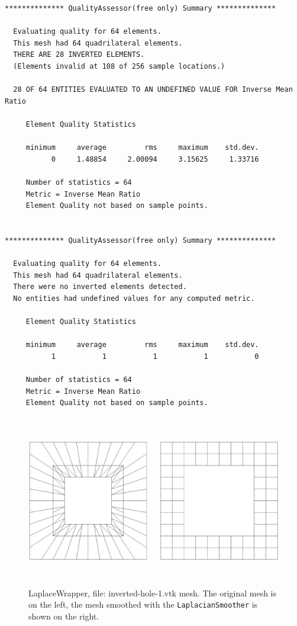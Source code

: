 \begin{verbatim}
************** QualityAssessor(free only) Summary **************

  Evaluating quality for 64 elements.
  This mesh had 64 quadrilateral elements.
  THERE ARE 28 INVERTED ELEMENTS.
  (Elements invalid at 108 of 256 sample locations.)

  28 OF 64 ENTITIES EVALUATED TO AN UNDEFINED VALUE FOR Inverse Mean Ratio

     Element Quality Statistics

     minimum     average         rms     maximum    std.dev.
           0     1.48854     2.00094     3.15625     1.33716

     Number of statistics = 64
     Metric = Inverse Mean Ratio
     Element Quality not based on sample points.


************** QualityAssessor(free only) Summary **************

  Evaluating quality for 64 elements.
  This mesh had 64 quadrilateral elements.
  There were no inverted elements detected.
  No entities had undefined values for any computed metric.

     Element Quality Statistics

     minimum     average         rms     maximum    std.dev.
           1           1           1           1           0

     Number of statistics = 64
     Metric = Inverse Mean Ratio
     Element Quality not based on sample points.
\end{verbatim}
\begin{figure}[htbp]
\begin{center}
    \includegraphics[height=75mm]{inverted-hole-1.eps}
    \caption{LaplaceWrapper, file: inverted-hole-1.vtk mesh. The original mesh is on the left, the mesh smoothed with the \texttt{LaplacianSmoother} is shown on the right.}
    \label{fig:inverted_hole_1}
\end{center}
\end{figure}

